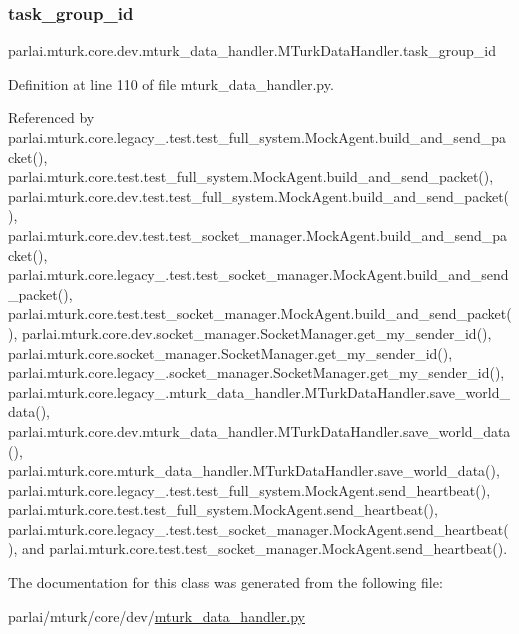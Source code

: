 \mbox{\label{classparlai_1_1mturk_1_1core_1_1dev_1_1mturk__data__handler_1_1MTurkDataHandler_af4bebaca067ce2d388fe76ee8859e1bd}} 
\subsubsection{\texorpdfstring{task\+\_\+group\+\_\+id}{task\_group\_id}}
{\footnotesize\ttfamily parlai.\+mturk.\+core.\+dev.\+mturk\+\_\+data\+\_\+handler.\+M\+Turk\+Data\+Handler.\+task\+\_\+group\+\_\+id}



Definition at line 110 of file mturk\+\_\+data\+\_\+handler.\+py.



Referenced by parlai.\+mturk.\+core.\+legacy\+\_.\+test.\+test\+\_\+full\+\_\+system.\+Mock\+Agent.\+build\+\_\+and\+\_\+send\+\_\+packet(), parlai.\+mturk.\+core.\+test.\+test\+\_\+full\+\_\+system.\+Mock\+Agent.\+build\+\_\+and\+\_\+send\+\_\+packet(), parlai.\+mturk.\+core.\+dev.\+test.\+test\+\_\+full\+\_\+system.\+Mock\+Agent.\+build\+\_\+and\+\_\+send\+\_\+packet(), parlai.\+mturk.\+core.\+dev.\+test.\+test\+\_\+socket\+\_\+manager.\+Mock\+Agent.\+build\+\_\+and\+\_\+send\+\_\+packet(), parlai.\+mturk.\+core.\+legacy\+\_.\+test.\+test\+\_\+socket\+\_\+manager.\+Mock\+Agent.\+build\+\_\+and\+\_\+send\+\_\+packet(), parlai.\+mturk.\+core.\+test.\+test\+\_\+socket\+\_\+manager.\+Mock\+Agent.\+build\+\_\+and\+\_\+send\+\_\+packet(), parlai.\+mturk.\+core.\+dev.\+socket\+\_\+manager.\+Socket\+Manager.\+get\+\_\+my\+\_\+sender\+\_\+id(), parlai.\+mturk.\+core.\+socket\+\_\+manager.\+Socket\+Manager.\+get\+\_\+my\+\_\+sender\+\_\+id(), parlai.\+mturk.\+core.\+legacy\+\_.\+socket\+\_\+manager.\+Socket\+Manager.\+get\+\_\+my\+\_\+sender\+\_\+id(), parlai.\+mturk.\+core.\+legacy\+\_.\+mturk\+\_\+data\+\_\+handler.\+M\+Turk\+Data\+Handler.\+save\+\_\+world\+\_\+data(), parlai.\+mturk.\+core.\+dev.\+mturk\+\_\+data\+\_\+handler.\+M\+Turk\+Data\+Handler.\+save\+\_\+world\+\_\+data(), parlai.\+mturk.\+core.\+mturk\+\_\+data\+\_\+handler.\+M\+Turk\+Data\+Handler.\+save\+\_\+world\+\_\+data(), parlai.\+mturk.\+core.\+legacy\+\_.\+test.\+test\+\_\+full\+\_\+system.\+Mock\+Agent.\+send\+\_\+heartbeat(), parlai.\+mturk.\+core.\+test.\+test\+\_\+full\+\_\+system.\+Mock\+Agent.\+send\+\_\+heartbeat(), parlai.\+mturk.\+core.\+legacy\+\_.\+test.\+test\+\_\+socket\+\_\+manager.\+Mock\+Agent.\+send\+\_\+heartbeat(), and parlai.\+mturk.\+core.\+test.\+test\+\_\+socket\+\_\+manager.\+Mock\+Agent.\+send\+\_\+heartbeat().



The documentation for this class was generated from the following file\+:\begin{DoxyCompactItemize}
\item 
parlai/mturk/core/dev/\hyperlink{dev_2mturk__data__handler_8py}{mturk\+\_\+data\+\_\+handler.\+py}\end{DoxyCompactItemize}
